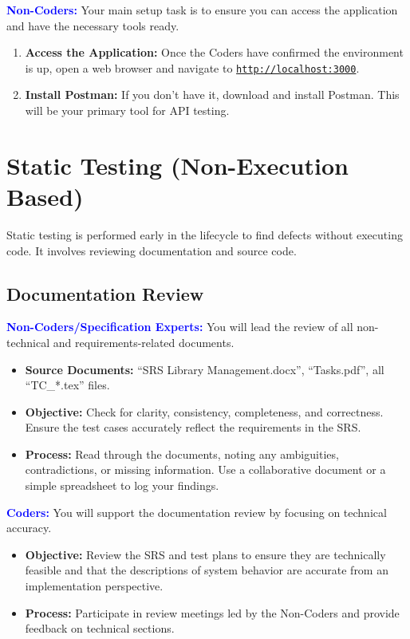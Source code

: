 \documentclass{article}
\newcommand{\role}[1]{\textbf{\textcolor{blue}{#1:}}}
\begin{document}
\role{Non-Coders}
Your main setup task is to ensure you can access the application and have the necessary tools ready.
\begin{enumerate}
    \item \textbf{Access the Application:} Once the Coders have confirmed the environment is up, open a web browser and navigate to \href{http://localhost:3000}{\texttt{http://localhost:3000}}.
    \item \textbf{Install Postman:} If you don't have it, download and install Postman. This will be your primary tool for API testing.
\end{enumerate}

\section{Static Testing (Non-Execution Based)}
Static testing is performed early in the lifecycle to find defects without executing code. It involves reviewing documentation and source code.

\subsection{Documentation Review}
\role{Non-Coders/Specification Experts}
You will lead the review of all non-technical and requirements-related documents.
\begin{itemize}
    \item \textbf{Source Documents:} ``SRS Library Management.docx'', ``Tasks.pdf'', all ``TC\_*.tex'' files.
    \item \textbf{Objective:} Check for clarity, consistency, completeness, and correctness. Ensure the test cases accurately reflect the requirements in the SRS.
    \item \textbf{Process:} Read through the documents, noting any ambiguities, contradictions, or missing information. Use a collaborative document or a simple spreadsheet to log your findings.
\end{itemize}

\role{Coders}
You will support the documentation review by focusing on technical accuracy.
\begin{itemize}
    \item \textbf{Objective:} Review the SRS and test plans to ensure they are technically feasible and that the descriptions of system behavior are accurate from an implementation perspective.
    \item \textbf{Process:} Participate in review meetings led by the Non-Coders and provide feedback on technical sections.
\end{itemize}
\end{document}
